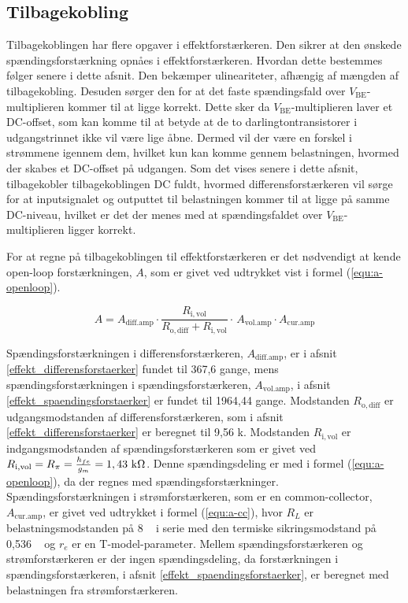 \subsection{Tilbagekobling}
\label{effekt_tilbagekobling}
Tilbagekoblingen har flere opgaver i effektforstærkeren. Den sikrer at den ønskede spændingsforstærkning opnåes i effektforstærkeren. Hvordan dette bestemmes følger senere i dette afsnit. Den bekæmper ulineariteter, afhængig af mængden af tilbagekobling. Desuden sørger den for at det faste spændingsfald over $V_\mathrm{BE}$-multiplieren kommer til at ligge korrekt. Dette sker da $V_\mathrm{BE}$-multiplieren laver et DC-offset, som kan komme til at betyde at de to darlingtontransistorer i udgangstrinnet ikke vil være lige åbne. Dermed vil der være en forskel i strømmene igennem dem, hvilket kun kan komme gennem belastningen, hvormed der skabes et DC-offset på udgangen. Som det vises senere i dette afsnit, tilbagekobler tilbagekoblingen DC fuldt, hvormed differensforstærkeren vil sørge for at inputsignalet og outputtet til belastningen kommer til at ligge på samme DC-niveau, hvilket er det der menes med at spændingsfaldet over $V_\mathrm{BE}$-multiplieren ligger korrekt. 

For at regne på tilbagekoblingen til effektforstærkeren er det nødvendigt at kende open-loop forstærkningen, $A$, som er givet ved udtrykket vist i formel (\ref{equ:a-openloop}).

\begin{equation}
\label{equ:a-openloop}
A = A_\mathrm{diff.amp} \cdot \frac{R_\mathrm{i,vol}}{R_\mathrm{o,diff} + R_\mathrm{i,vol}} \cdot \frac{}{} A_\mathrm{vol.amp} \cdot A_\mathrm{cur.amp}
\end{equation}

Spændingsforstærkningen i differensforstærkeren, $A_\mathrm{diff.amp}$, er i afsnit \ref{effekt_differensforstaerker} fundet til 367,6 gange, mens spændingsforstærkningen i spændingsforstærkeren, $A_\mathrm{vol.amp}$, i afsnit \ref{effekt_spaendingsforstaerker} er fundet til 1964,44 gange. Modstanden $R_\mathrm{o,diff}$ er udgangsmodstanden af differensforstærkeren, som i afsnit \ref{effekt_differensforstaerker} er beregnet til 9,56 k\ohm. Modstanden $R_\mathrm{i,vol}$ er indgangsmodstanden af spændingsforstærkeren som er givet ved $R_\mathrm{i,vol} = R_\pi = \frac{h_{fe}}{g_m} = 1,43~\mathrm{k}\ohm$. Denne spændingsdeling er med i formel (\ref{equ:a-openloop}), da der regnes med spændingsforstærkninger. Spændingsforstærkningen i strømforstærkeren, som er en common-collector, $A_\mathrm{cur.amp}$, er givet ved udtrykket i formel (\ref{equ:a-cc}), hvor $R_L$ er belastningsmodstanden på 8 \ohm~ i serie med den termiske sikringsmodstand på 0,536 \ohm~ og $r_e$ er en T-model-parameter. Mellem spændingsforstærkeren og strømforstærkeren er der ingen spændingsdeling, da forstærkningen i spændingsforstærkeren, i afsnit \ref{effekt_spaendingsforstaerker}, er beregnet med belastningen fra strømforstærkeren.

